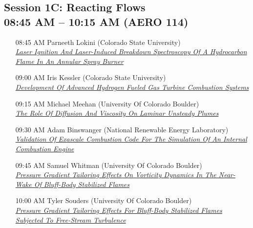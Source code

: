 \subsection*{Session 1C: Reacting Flows \\ 08:45 AM  -- 10:15 AM (AERO 114)}
\begin{enumerate}
\item [08:45 AM] Parneeth  Lokini (Colorado State University) \\ \hyperlink{Parneeth Lokini}{\it Laser Ignition And Laser-Induced Breakdown Spectroscopy Of A Hydrocarbon Flame In An Annular Spray Burner }
\item [09:00 AM] Iris Kessler (Colorado State University) \\ \hyperlink{IrisKessler}{\it Development Of Advanced Hydrogen Fueled Gas Turbine Combustion Systems }
\item [09:15 AM] Michael Meehan (University Of Colorado Boulder) \\ \hyperlink{MichaelMeehan}{\it The Role Of Diffusion And Viscosity On Laminar Unsteady Plumes }
\item [09:30 AM] Adam Binswanger (National Renewable Energy Laboratory) \\ \hyperlink{AdamBinswanger}{\it Validation Of Exascale Combustion Code For The Simulation Of An Internal Combustion Engine }
\item [09:45 AM] Samuel Whitman (University Of Colorado Boulder) \\ \hyperlink{SamuelWhitman}{\it Pressure Gradient Tailoring Effects On Vorticity Dynamics In The Near-Wake Of Bluff-Body Stabilized Flames }
\item [10:00 AM] Tyler Souders (University Of Colorado Boulder) \\ \hyperlink{TylerSouders}{\it Pressure Gradient Tailoring Effects For Bluff-Body Stabilized Flames Subjected To Free-Stream Turbulence }
\end{enumerate}
